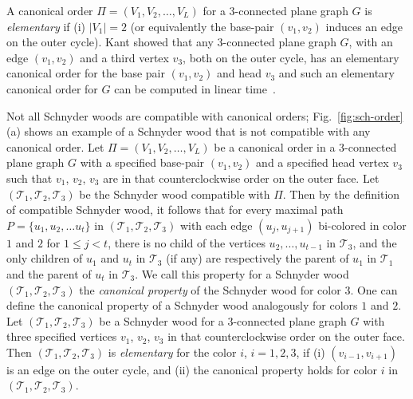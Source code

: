 \documentclass{article}
\newcommand{\TT}{{\mathcal{T}}}
\newcommand{\df}{\textit}
\begin{document}
A canonical order $\Pi=(V_1,V_2,\ldots,V_L)$ for a $3$-connected plane graph $G$ is \df{elementary}
 if (i) $|V_1|=2$ (or equivalently the base-pair $(v_1, v_2)$ induces an edge on the outer cycle).
Kant showed that any $3$-connected plane graph $G$, with an edge $(v_1, v_2)$ and a third vertex $v_3$,
 both on the outer cycle, has an elementary canonical order for the base pair $(v_1,v_2)$ and head $v_3$
 and such an elementary canonical order for $G$ can be computed in linear time~\cite{Kan96}.




Not all Schnyder woods are compatible with canonical orders; Fig.~\ref{fig:sch-order}(a) shows an example
 of a Schnyder wood that is not compatible with any canonical order.
 Let $\Pi=(V_1,V_2,\ldots,V_L)$ be a canonical order in a $3$-connected plane graph $G$ with
 a specified base-pair $(v_1,v_2)$ and a specified
 head vertex $v_3$ such that $v_1$, $v_2$, $v_3$ are in that counterclockwise order on the outer face.
 Let  $(\TT_1, \TT_2, \TT_3)$ be the Schnyder wood compatible with $\Pi$.
 Then by the definition of compatible Schnyder wood, it follows that
for every maximal path $P=\{u_1, u_2, \ldots u_t\}$ in $(\TT_1, \TT_2, \TT_3)$
 with each edge $(u_j, u_{j+1})$ bi-colored in color $1$ and $2$ for $1\le j<t$, there is no child of the vertices
 $u_2, \ldots, u_{t-1}$ in $\TT_3$, and the only children of $u_1$ and $u_t$ in $\TT_3$ (if any) are
 respectively the parent of $u_1$ in $\TT_1$ and the parent of $u_t$ in $\TT_3$.
We call this property for a Schnyder wood $(\TT_1, \TT_2, \TT_3)$ the \df{canonical property} of the
 Schnyder wood for color 3. One can define the canonical property of a Schnyder wood analogously
 for colors $1$ and $2$.
Let $(\TT_1, \TT_2, \TT_3)$ be a Schnyder wood for a $3$-connected plane graph $G$ with three specified
 vertices $v_1$, $v_2$, $v_3$ in that counterclockwise order on the outer face. Then
 $(\TT_1, \TT_2, \TT_3)$ is \textit{elementary} for the color $i$, $i=1,2,3$, if (i) $(v_{i-1},v_{i+1})$ is an
 edge on the outer cycle, and (ii) the canonical property holds for color $i$ in $(\TT_1, \TT_2, \TT_3)$.
\end{document}
